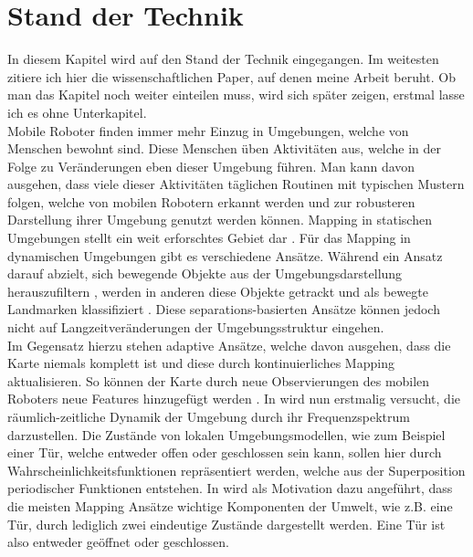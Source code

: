 \chapter{Stand der Technik}

In diesem Kapitel wird auf den Stand der Technik eingegangen. Im weitesten zitiere ich hier die wissenschaftlichen Paper, auf denen meine Arbeit beruht. Ob man das Kapitel noch weiter einteilen muss, wird sich später zeigen, erstmal lasse ich es ohne Unterkapitel. \\
Mobile Roboter finden immer mehr Einzug in Umgebungen, welche von Menschen bewohnt sind. Diese Menschen üben Aktivitäten aus, welche in der Folge zu Veränderungen eben dieser Umgebung führen. Man kann davon ausgehen, dass viele dieser Aktivitäten täglichen Routinen mit typischen Mustern folgen, welche von mobilen Robotern erkannt werden und zur robusteren Darstellung ihrer Umgebung genutzt werden können. Mapping in statischen Umgebungen stellt ein weit erforschtes Gebiet dar \cite{Eichler.2006}. Für das Mapping in dynamischen Umgebungen gibt es verschiedene Ansätze. Während ein Ansatz darauf abzielt, sich bewegende Objekte aus der Umgebungsdarstellung herauszufiltern \cite{Hahnel.30Sept.5Oct.2002}, werden in anderen diese Objekte getrackt und als bewegte Landmarken klassifiziert \cite{Montesano.2008}. Diese separations-basierten Ansätze können jedoch nicht auf Langzeitveränderungen der Umgebungsstruktur eingehen. \\
Im Gegensatz hierzu stehen adaptive Ansätze, welche davon ausgehen, dass die Karte niemals komplett ist und diese durch kontinuierliches Mapping aktualisieren. So können der Karte durch neue Observierungen des mobilen Roboters neue Features hinzugefügt werden 
\cite{Milford.2010}. In \cite{Krajnik.2014} wird nun erstmalig versucht, die räumlich-zeitliche Dynamik der Umgebung durch ihr Frequenzspektrum darzustellen. Die Zustände von lokalen Umgebungsmodellen, wie zum Beispiel einer Tür, welche entweder offen oder geschlossen sein kann, sollen hier durch Wahrscheinlichkeitsfunktionen repräsentiert werden, welche aus der Superposition periodischer Funktionen entstehen. In \cite{Krajnik.2014} wird als Motivation dazu angeführt, dass die meisten Mapping Ansätze wichtige Komponenten der Umwelt, wie z.B. eine Tür, durch lediglich zwei eindeutige Zustände dargestellt werden. Eine Tür ist also entweder geöffnet oder geschlossen. %

